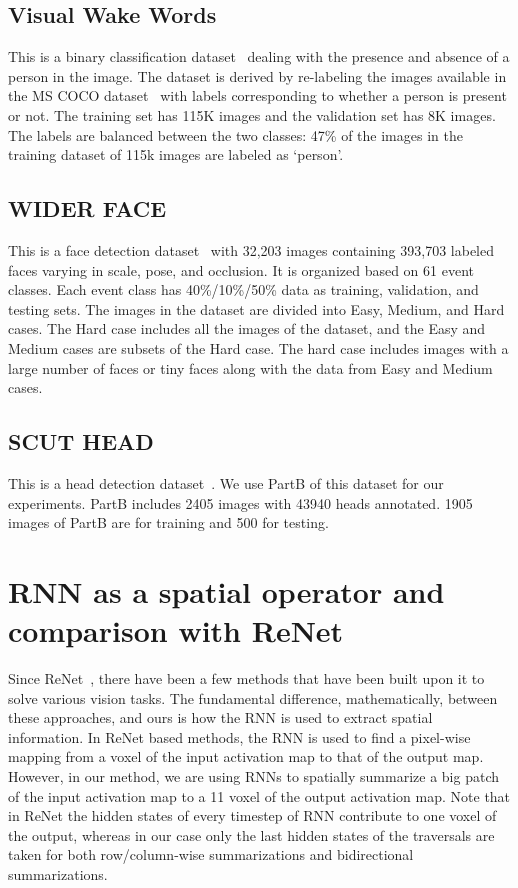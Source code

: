 \documentclass[10pt]{article}
\begin{document}
\subsection{Visual Wake Words}
This is a binary classification dataset~\citep{chowdhery2019visual}
dealing with the presence and absence of a person in the image. The
dataset is derived by re-labeling the images available in the MS COCO
dataset~\citep{lin2014microsoft} with labels corresponding to whether
a person is present or not. The training set has 115K images and the
validation set has 8K images. The labels are balanced between the two
classes: 47\% of the images in the training dataset of 115k images are
labeled as ‘person’.
 
\subsection{WIDER FACE}
This is a face detection dataset~\citep{yang2016wider} with 32,203
images containing 393,703 labeled faces varying in scale, pose, and
occlusion. It is organized based on 61 event classes. Each event class
has 40\%/10\%/50\% data as training, validation, and testing sets. The
images in the dataset are divided into Easy, Medium, and Hard
cases. The Hard case includes all the images of the dataset, and the
Easy and Medium cases are subsets of the Hard case. The hard case
includes images with a large number of faces or tiny faces along with
the data from Easy and Medium cases.


\subsection{SCUT HEAD}
This is a head detection dataset~\citep{peng2018detecting}. We use PartB
of this dataset for our experiments. PartB includes 2405 images with 43940
heads annotated. 1905 images of PartB are for training and 500 for testing. 
\section{RNN as a spatial operator and comparison with ReNet}
\label{sec:renetapp}

Since ReNet~\cite{visin2015renet}, there have been a few methods that
have been built upon it to solve various vision tasks. The fundamental
difference, mathematically, between these approaches, and ours is how
the RNN is used to extract spatial information. In ReNet based
methods, the RNN is used to find a pixel-wise mapping from a voxel of
the input activation map to that of the output map. However, in our
method, we are using RNNs to spatially summarize a big patch of the
input activation map to a 11 voxel of the output activation
map. Note that in ReNet the hidden states of every timestep of RNN
contribute to one voxel of the output, whereas in our case only the
last hidden states of the traversals are taken for both
row/column-wise summarizations and bidirectional summarizations.
\end{document}
